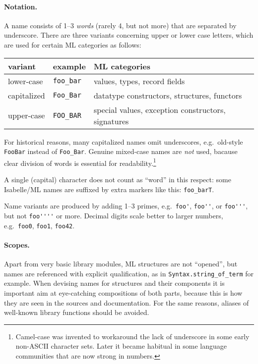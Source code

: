 \begin{isabellebody}
\begin{isamarkuptext}
  \paragraph{Notation.}  A name consists of 1--3 \emph{words} (rarely
  4, but not more) that are separated by underscore.  There are three
  variants concerning upper or lower case letters, which are used for
  certain ML categories as follows:

  \medskip
  \begin{tabular}{lll}
  variant & example & ML categories \\\hline
  lower-case & \verb|foo_bar| & values, types, record fields \\
  capitalized & \verb|Foo_Bar| & datatype constructors, structures, functors \\
  upper-case & \verb|FOO_BAR| & special values, exception constructors, signatures \\
  \end{tabular}
  \medskip

  For historical reasons, many capitalized names omit underscores,
  e.g.\ old-style \verb|FooBar| instead of \verb|Foo_Bar|.
  Genuine mixed-case names are \emph{not} used, bacause clear division
  of words is essential for readability.\footnote{Camel-case was
  invented to workaround the lack of underscore in some early
  non-ASCII character sets.  Later it became habitual in some language
  communities that are now strong in numbers.}

  A single (capital) character does not count as ``word'' in this
  respect: some Isabelle/ML names are suffixed by extra markers like
  this: \verb|foo_barT|.

  Name variants are produced by adding 1--3 primes, e.g.\ \verb|foo'|, \verb|foo''|, or \verb|foo'''|, but not \verb|foo''''| or more.  Decimal digits scale better to larger numbers,
  e.g.\ \verb|foo0|, \verb|foo1|, \verb|foo42|.

  \paragraph{Scopes.}  Apart from very basic library modules, ML
  structures are not ``opened'', but names are referenced with
  explicit qualification, as in \verb|Syntax.string_of_term| for
  example.  When devising names for structures and their components it
  is important aim at eye-catching compositions of both parts, because
  this is how they are seen in the sources and documentation.  For the
  same reasons, aliases of well-known library functions should be
  avoided.


\end{isamarkuptext}
\end{isabellebody}
